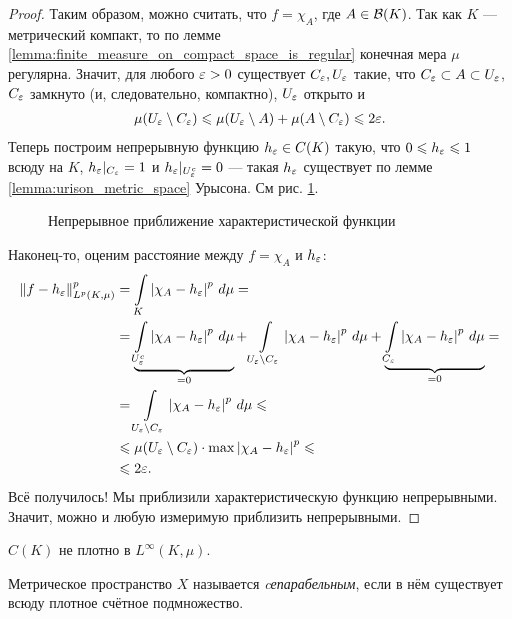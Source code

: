 \begin{proof}
Таким образом, можно считать, что $f = \chi_A$, где $A \in \mathcal{B}(K)$. Так как $K$ --- метрический компакт, то по лемме \ref{lemma:finite_measure_on_compact_space_is_regular} конечная мера $\mu$ регулярна. Значит, для любого $\varepsilon > 0$ существует $C_{\varepsilon}, U_{\varepsilon}$ такие, что $C_{\varepsilon} \subset A \subset U_{\varepsilon}$, $C_{\varepsilon}$ замкнуто (и, следовательно, компактно), $U_{\varepsilon}$ открыто и 
\begin{align*}
\mu(U_{\varepsilon} \setminus C_{\varepsilon}) \leqslant \mu(U_{\varepsilon} \setminus A) + \mu(A \setminus C_{\varepsilon}) \leqslant 2\varepsilon
.\end{align*} Теперь построим непрерывную функцию $h_{\varepsilon} \in C(K)$ такую, что $0 \leqslant h_{\varepsilon} \leqslant 1$ всюду на $K$, $h_{\varepsilon} \rvert_{C_{\varepsilon}} = 1$ и $h_{\varepsilon} \rvert_{U^{c}_{\varepsilon}} = 0$ --- такая $h_{\varepsilon}$ существует по лемме \ref{lemma:urison_metric_space} Урысона. См рис. \ref{fig:continuous-approximation-of-characteristic-function}.

\begin{figure}[ht]
    \centering
    \caption{Непрерывное приближение характеристической функции}
    \label{fig:continuous-approximation-of-characteristic-function}
\end{figure}

Наконец-то, оценим расстояние между $f = \chi_A$ и $h_{\varepsilon}$:
\begin{align*}
 \left\| f - h_{\varepsilon} \right\|_{L^{p}(K,\mu)}^{p} &= \int\limits_{K} \left| \chi_A - h_\varepsilon \right|^{p} \, d\mu  = \\ &= \underbrace{\int\limits_{U_{\varepsilon}^{c}} \left| \chi_A - h_{\varepsilon} \right|^{p} \, d\mu}_{=0}   + \int\limits_{U_{\varepsilon} \setminus C_{\varepsilon}} \left| \chi_A - h_{\varepsilon} \right|^{p} \, d\mu  + \underbrace{\int\limits_{C_{\varepsilon}} \left| \chi_A - h_{\varepsilon} \right|^{p} \, d\mu}_{= 0}  = \\
 &= \int\limits_{U_{\varepsilon} \setminus C_{\varepsilon}} \left| \chi_A - h_{\varepsilon} \right|^{p} \, d\mu  \leqslant \\
  & \leqslant \mu(U_{\varepsilon} \setminus C_{\varepsilon}) \cdot \max \left| \chi_A - h_{\varepsilon} \right|^{p} \leqslant \\
  &\leqslant 2\varepsilon
.\end{align*} Всё получилось! Мы приблизили характеристическую функцию непрерывными. Значит, можно и любую измеримую приблизить непрерывными.
\end{proof}
\begin{remrk*}
 $C(K)$ не плотно в $L^{\infty}(K, \mu)$.
\end{remrk*}
\begin{df*}
 Метрическое пространство $X$ называется \textit{cепарабельным}, если в нём существует всюду плотное счётное подмножество.
\end{df*}

